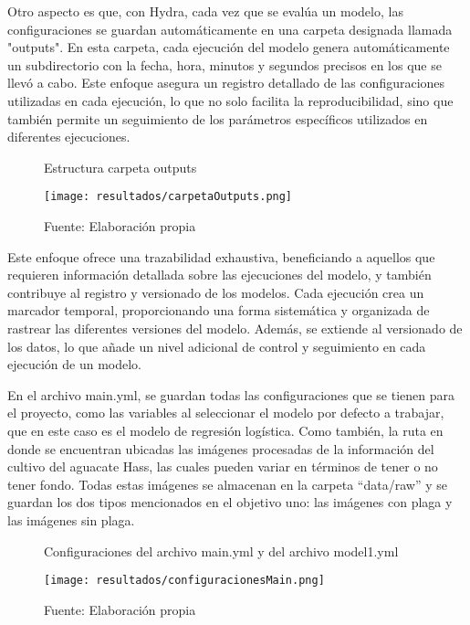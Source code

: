 Otro aspecto es que, con Hydra, cada vez que se evalúa un modelo, las configuraciones se guardan automáticamente en una carpeta designada llamada "outputs". En esta carpeta, cada ejecución del modelo genera automáticamente un subdirectorio con la fecha, hora, minutos y segundos precisos en los que se llevó a cabo. Este enfoque asegura un registro detallado de las configuraciones utilizadas en cada ejecución, lo que no solo facilita la reproducibilidad, sino que también permite un seguimiento de los parámetros específicos utilizados en diferentes ejecuciones.

\begin{figure}[h]
\centering
\caption{Estructura carpeta outputs}
\texttt{[image: resultados/carpetaOutputs.png]}
\caption*{\footnotesize Fuente: Elaboración propia}
\label{fig:figuraEstructuraCarpetaOutputs}
\end{figure}

\newpage

Este enfoque ofrece una trazabilidad exhaustiva, beneficiando a aquellos que requieren información detallada sobre las ejecuciones del modelo, y también contribuye al registro y versionado de los modelos. Cada ejecución crea un marcador temporal, proporcionando una forma sistemática y organizada de rastrear las diferentes versiones del modelo. Además, se extiende al versionado de los datos, lo que añade un nivel adicional de control y seguimiento en cada ejecución de un modelo. \newline

En el archivo main.yml, se guardan todas las configuraciones que se tienen para el proyecto, como las variables al seleccionar el modelo por defecto a trabajar, que en este caso es el modelo de regresión logística. Como también, la ruta en donde se encuentran ubicadas las imágenes procesadas de la información del cultivo del aguacate Hass, las cuales pueden variar en términos de tener o no tener fondo. Todas estas imágenes se almacenan en la carpeta “data/raw” y se guardan los dos tipos mencionados en el objetivo uno: las imágenes con plaga y las imágenes sin plaga.

\begin{figure}[h]
\centering
\caption{Configuraciones del archivo main.yml y del archivo model1.yml}
\texttt{[image: resultados/configuracionesMain.png]}
\caption*{\footnotesize Fuente: Elaboración propia}
\label{fig:figuraConfiguracionesMain}
\end{figure}


